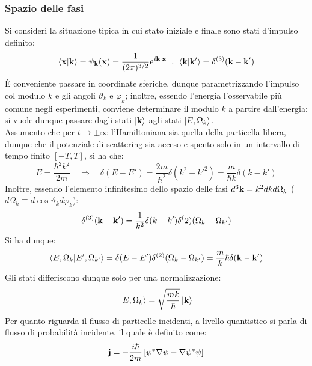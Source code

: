 \subsubsection{Spazio delle fasi}

Si consideri la situazione tipica in cui stato iniziale e finale sono stati d'impulso definito:
\begin{equation*}
	\braket{\mathbf{x} | \mathbf{k}} = \psi_{\mathbf{k}}(\mathbf{x}) = \frac{1}{(2\pi)^{3/2}} e^{i \mathbf{k} \cdot \mathbf{x}} \,\, : \,\, \braket{\mathbf{k} | \mathbf{k}'} = \delta^{(3)}(\mathbf{k} - \mathbf{k}')
\end{equation*}
È conveniente passare in coordinate sferiche, dunque parametrizzando l'impulso col modulo $ k $ e gli angoli $ \vartheta_k $ e $ \varphi_k $; inoltre, essendo l'energia l'osservabile più comune negli esperimenti, conviene determinare il modulo $ k $ a partire dall'energia: si vuole dunque passare dagli stati $ \ket{\mathbf{k}} $ agli stati $ \ket{E, \Omega_k} $.\\
Assumento che per $ t \rightarrow \pm \infty $ l'Hamiltoniana sia quella della particella libera, dunque che il potenziale di scattering sia acceso e spento solo in un intervallo di tempo finito $ [-T, T] $, si ha che:
\begin{equation*}
	E = \frac{\hbar^2 k^2}{2m}
	\quad \Rightarrow \quad
	\delta (E - E') = \frac{2m}{\hbar^2} \delta(k^2 - k'^2) = \frac{m}{\hbar k} \delta(k - k')
\end{equation*}
Inoltre, essendo l'elemento infinitesimo dello spazio delle fasi $ d^3\mathbf{k} = k^2 dk d \Omega_k $ ($ d\Omega_k \equiv d \cos \vartheta_k d \varphi_k $):
\begin{equation*}
	\delta^{(3)}(\mathbf{k} - \mathbf{k}') = \frac{1}{k^2} \delta(k - k') \delta^(2)(\Omega_k - \Omega_{k'})
\end{equation*}
Si ha dunque:
\begin{equation*}
	\braket{E, \Omega_k | E', \Omega_{k'}} = \delta(E - E') \delta^{(2)}(\Omega_k - \Omega_{k'}) = \frac{m}k{\hbar} \delta(\mathbf{k} - \mathbf{k}')
\end{equation*}
Gli stati differiscono dunque solo per una normalizzazione:
\begin{equation}
	\ket{E, \Omega_k} = \sqrt{\frac{mk}{\hbar}} \ket{\mathbf{k}}
	\label{eq:5.28}
\end{equation}
Per quanto riguarda il flusso di particelle incidenti, a livello quantistico si parla di flusso di probabilità incidente, il quale è definito come:
\begin{equation}
	\mathbf{j} = - \frac{i\hbar}{2m} \left[ \psi^* \nabla \psi - \nabla \psi^* \psi \right]
	\label{eq:5.29}
\end{equation}
